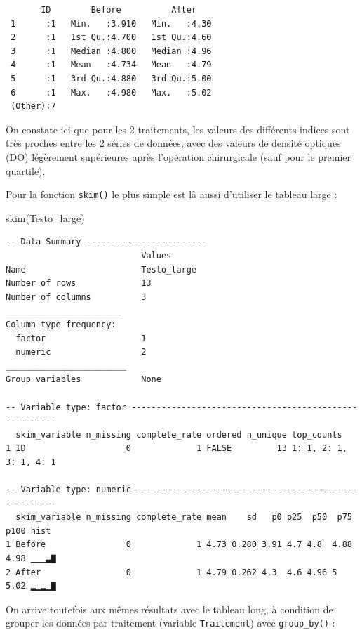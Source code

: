 \documentclass[
  french,
  a4paper,
  DIV=11,
  numbers=noendperiod,
  oneside]{scrreprt}
\newenvironment{Shaded}{}{}
\newcommand{\FunctionTok}[1]{\textcolor[rgb]{0.44,0.26,0.76}{#1}}
\newcommand{\NormalTok}[1]{\textcolor[rgb]{0.14,0.16,0.18}{#1}}
\begin{document}
\begin{verbatim}
       ID        Before          After     
 1      :1   Min.   :3.910   Min.   :4.30  
 2      :1   1st Qu.:4.700   1st Qu.:4.60  
 3      :1   Median :4.800   Median :4.96  
 4      :1   Mean   :4.734   Mean   :4.79  
 5      :1   3rd Qu.:4.880   3rd Qu.:5.00  
 6      :1   Max.   :4.980   Max.   :5.02  
 (Other):7                                 
\end{verbatim}

On constate ici que pour les 2 traitements, les valeurs des différents
indices sont très proches entre les 2 séries de données, avec des
valeurs de densité optiques (DO) légèrement supérieures après
l'opération chirurgicale (sauf pour le premier quartile).

Pour la fonction \texttt{skim()} le plus simple est là aussi d'utiliser
le tableau large :

\begin{Shaded}
\begin{Highlighting}[]
\FunctionTok{skim}\NormalTok{(Testo\_large)}
\end{Highlighting}
\end{Shaded}

\begin{verbatim}
-- Data Summary ------------------------
                           Values     
Name                       Testo_large
Number of rows             13         
Number of columns          3          
_______________________               
Column type frequency:                
  factor                   1          
  numeric                  2          
________________________              
Group variables            None       

-- Variable type: factor -------------------------------------------------------
  skim_variable n_missing complete_rate ordered n_unique top_counts            
1 ID                    0             1 FALSE         13 1: 1, 2: 1, 3: 1, 4: 1

-- Variable type: numeric ------------------------------------------------------
  skim_variable n_missing complete_rate mean    sd   p0 p25  p50  p75 p100 hist 
1 Before                0             1 4.73 0.280 3.91 4.7 4.8  4.88 4.98 ▁▁▁▃▇
2 After                 0             1 4.79 0.262 4.3  4.6 4.96 5    5.02 ▂▁▂▁▇
\end{verbatim}

On arrive toutefois aux mêmes résultats avec le tableau long, à
condition de grouper les données par traitement (variable
\texttt{Traitement}) avec \texttt{group\_by()} :
\end{document}
